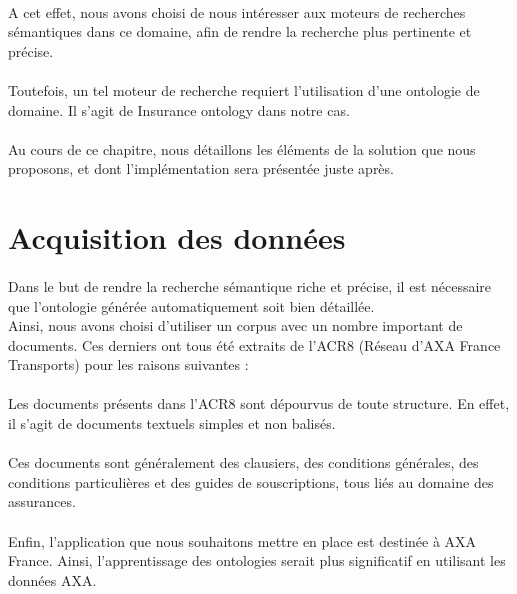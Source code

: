 \documentclass[12pt, a4paper, oneside]{book}
\begin{document}
\paragraph{}
A cet effet, nous avons choisi de nous intéresser aux moteurs de recherches sémantiques dans ce domaine, afin de rendre la recherche plus pertinente et précise.
\paragraph{}
Toutefois, un tel moteur de recherche requiert l'utilisation d'une ontologie de domaine. Il s'agit de Insurance ontology dans notre cas. 
\paragraph{}
Au cours de ce chapitre, nous détaillons les éléments de la solution que nous proposons, et dont l'implémentation sera présentée juste après.

\section{Acquisition des données}

\paragraph{}
Dans le but de rendre la recherche sémantique riche et précise, il est nécessaire que l'ontologie générée automatiquement soit bien détaillée.\\
Ainsi, nous avons choisi d'utiliser un corpus avec un nombre important de documents. Ces derniers ont tous été extraits de l'ACR8 (Réseau d'AXA France Transports) pour les raisons suivantes : 
\paragraph{}
Les documents présents dans l'ACR8 sont dépourvus de toute structure.
En effet, il s'agit de documents textuels simples et non balisés.
\paragraph{}
Ces documents sont généralement des clausiers, des conditions générales, des conditions particulières et des guides de souscriptions, tous liés au domaine des assurances.
\paragraph{}
Enfin, l'application que nous souhaitons mettre en place est destinée à AXA France. Ainsi, l'apprentissage des ontologies serait plus significatif en utilisant les données AXA.
\end{document}
